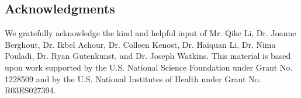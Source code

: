 \documentclass[a0,portrait]{a0poster}
\begin{document}
\begin{multicols}{3}


\subsection*{Acknowledgments}

We gratefully acknowledge the kind and helpful input of Mr. Qike Li, Dr. Joanne Berghout, Dr. Ikbel Achour, Dr. Colleen Kenost, Dr. Haiquan Li, Dr. Nima Pouladi, Dr. Ryan Gutenkunst, and Dr. Joseph Watkins. This material is based upon work supported by the U.S. National Science Foundation under Grant No. 1228509 and by the U.S. National Institutes of Health under Grant No. R03ES027394.



\end{multicols}
\end{document}
